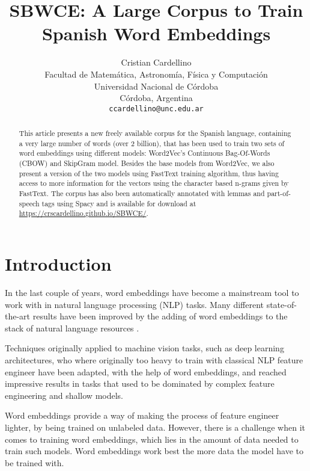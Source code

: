 \documentclass{article}
\title{SBWCE: A Large Corpus to Train Spanish Word Embeddings}
\author{
  Cristian Cardellino \\
  Facultad de Matem\'atica, Astronom\'ia, F\'isica y Computaci\'on \\
  Universidad Nacional de C\'ordoba \\
  C\'ordoba, Argentina \\
  \texttt{ccardellino@unc.edu.ar} \\
}
\date{}
\begin{document}
\maketitle

\begin{abstract}
  This article presents a new freely available corpus for the Spanish language,
  containing a very large number of words (over 2 billion), that has been used
  to train two sets of word embeddings using different models: Word2Vec's
  \cite{DBLP:journals/corr/abs-1301-3781} Continuous Bag-Of-Words (CBOW) and
  SkipGram model. Besides the base models from Word2Vec, we also present a
  version of the two models using FastText \cite{rehurek_lrec} training
  algorithm, thus having access to more information for the vectors using the
  character based n-grams given by FastText. The corpus has also been
  automatically annotated with lemmas and part-of-speech tags using Spacy
  \cite{spacy2} and is available for download at
  \url{https://crscardellino.github.io/SBWCE/}.
\end{abstract}




\section{Introduction}

In the last couple of years, word embeddings have become a mainstream tool to
work with in natural language processing (NLP) tasks. Many different
state-of-the-art results have been improved by the adding of word embeddings to
the stack of natural language resources
\cite{Collobert:2011:NLP:1953048.2078186}.

Techniques originally applied to machine vision tasks, such as deep learning
architectures, who where originally too heavy to train with classical NLP
feature engineer have been adapted, with the help of word embeddings, and
reached impressive results in tasks that used to be dominated by complex
feature engineering and shallow models.

Word embeddings provide a way of making the process of feature engineer
lighter, by being trained on unlabeled data. However, there is a challenge when
it comes to training word embeddings, which lies in the amount of data needed
to train such models. Word embeddings work best the more data the model have to
be trained with.
\end{document}
